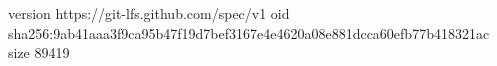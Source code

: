 version https://git-lfs.github.com/spec/v1
oid sha256:9ab41aaa3f9ca95b47f19d7bef3167e4e4620a08e881dcca60efb77b418321ac
size 89419

